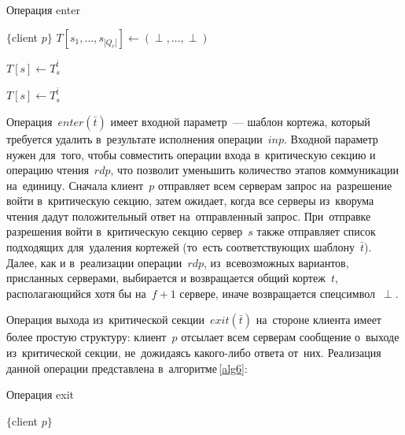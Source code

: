 \begin{algorithm}[H]
	\caption{Операция enter}\label{alg5}
	\begin{algorithmic}[1]
		\Statex $\{$client $p \}$
		\State $T[s_1, \dots, s_{|Q_r|}] \gets (\perp, \dots, \perp)$
		
		\State {}
		\State $T[s] \gets T_s^{\bar t}$
		\EndFor
		
		\State {}
		\State $T[s] \gets T_s^{\bar t}$
		\EndFor
		
		\State {}
		\EndIf
		\State \Return{$\perp$}
		\EndFunction
	\end{algorithmic}
\end{algorithm}

Операция~$enter(\bar t)$ имеет входной параметр~--- шаблон кортежа, который требуется удалить в~результате исполнения операции~$inp$. Входной параметр нужен для~того, чтобы совместить операции входа в~критическую секцию и операцию чтения~$rdp$, что позволит уменьшить количество этапов коммуникации на~единицу. Сначала клиент~$p$ отправляет всем серверам запрос на~разрешение войти в~критическую секцию, затем ожидает, когда все серверы из~кворума чтения дадут положительный ответ на~отправленный запрос. При~отправке разрешения войти в~критическую секцию сервер~$s$ также отправляет список подходящих для~удаления кортежей (то~есть соответствующих шаблону~$\bar t$). Далее, как и в~реализации операции~$rdp$, из~всевозможных вариантов, присланных серверами, выбирается и возвращается общий кортеж~$t$, располагающийся хотя бы на~$f + 1$ сервере, иначе возвращается спецсимвол~$\perp$.

Операция выхода из~критической секции~$exit(\bar t)$ на~стороне клиента имеет более простую структуру: клиент~$p$ отсылает всем серверам сообщение о~выходе из~критической секции, не~дожидаясь какого-либо ответа от~них. Реализация данной операции представлена в~алгоритме\,\ref{alg6}:

\begin{algorithm}[H]
	\caption{Операция exit}\label{alg6}
	\begin{algorithmic}[1]
		\Statex $\{$client $p \}$
		\State {}
		\EndFor
		\EndProcedure
	\end{algorithmic}
\end{algorithm}

